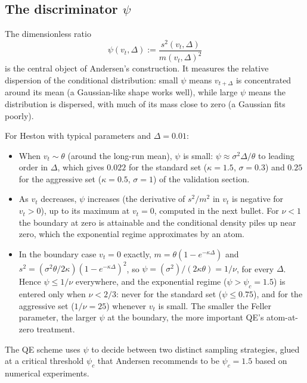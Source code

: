 \documentclass[11pt]{article}
\theoremstyle{plain}
\theoremstyle{definition}
\theoremstyle{remark}
\begin{document}
\subsection{The discriminator $\psi$}

The dimensionless ratio
\begin{equation}
    \psi(v_t, \Delta) := \frac{s^2(v_t, \Delta)}{m(v_t, \Delta)^2}                                                          \label{eq:psi-def}
\end{equation}
is the central object of Andersen's construction. It measures the relative dispersion of the conditional distribution: small $\psi$ means $v_{t+\Delta}$ is concentrated around its mean (a Gaussian-like shape works well), while large $\psi$ means the distribution is dispersed, with much of its mass close to zero (a Gaussian fits poorly).

For Heston with typical parameters and $\Delta = 0.01$:
\begin{itemize}[topsep=2pt]
    \item When $v_t \sim \theta$ (around the long-run mean), $\psi$ is small: $\psi \approx \sigma^2\Delta/\theta$ to leading order in $\Delta$, which gives $0.022$ for the standard set ($\kappa = 1.5$, $\sigma = 0.3$) and $0.25$ for the aggressive set ($\kappa = 0.5$, $\sigma = 1$) of the validation section.
    \item As $v_t$ decreases, $\psi$ increases (the derivative of $s^2/m^2$ in $v_t$ is negative for $v_t > 0$), up to its maximum at $v_t = 0$, computed in the next bullet. For $\nu < 1$ the boundary at zero is attainable and the conditional density piles up near zero, which the exponential regime approximates by an atom.
    \item In the boundary case $v_t = 0$ exactly, $m = \theta(1 - e^{-\kappa\Delta})$ and $s^2 = (\sigma^2 \theta / 2\kappa)(1 - e^{-\kappa\Delta})^2$, so $\psi = (\sigma^2)/(2\kappa\theta) = 1/\nu$, for every $\Delta$. Hence $\psi \leq 1/\nu$ everywhere, and the exponential regime ($\psi > \psi_c = 1.5$) is entered only when $\nu < 2/3$: never for the standard set ($\psi \leq 0.75$), and for the aggressive set ($1/\nu = 25$) whenever $v_t$ is small. The smaller the Feller parameter, the larger $\psi$ at the boundary, the more important QE's atom-at-zero treatment.
\end{itemize}

The QE scheme uses $\psi$ to decide between two distinct sampling strategies, glued at a critical threshold $\psi_c$ that Andersen recommends to be $\psi_c = 1.5$ based on numerical experiments.
\end{document}
